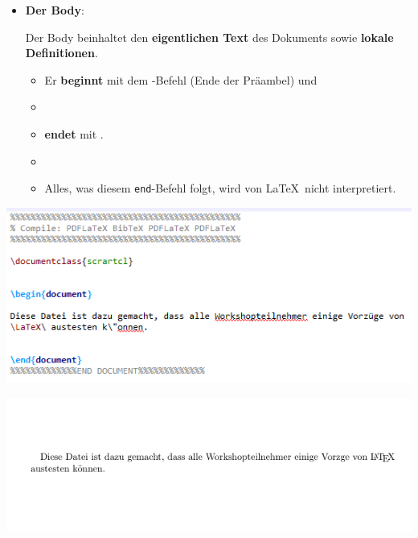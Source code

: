 \begin{frame}[fragile]

\begin{itemize}
\item \textbf{Der Body}:

Der Body beinhaltet den \textbf{eigentlichen Text} des Dokuments sowie \textbf{lokale Definitionen}.

	\begin{itemize}
	
		\item Er \textbf{beginnt} mit dem \lstinline||-Befehl  (Ende der Präambel) und
		
		\item[]
		
		\item \textbf{endet} mit \lstinline||. 
		
		\item[]
		
		\item Alles, was diesem \texttt{end}-Befehl folgt, wird von \LaTeX\ nicht interpretiert.
	\end{itemize}
\end{itemize}

\end{frame}


\begin{frame}[fragile]

	
	\centering
	\includegraphics[width=0.9\linewidth]{../../texfiles-beamer/tex-material/WissArb-latex/latexTest1tex}
	
%
%
	
	\centering
	\includegraphics[width=0.86\linewidth]{../../texfiles-beamer/tex-material/WissArb-latex/latexTest1pdf}
	


\end{frame}
	

